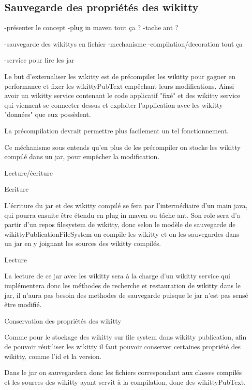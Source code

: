 \subsection{Sauvegarde des propriétés des wikitty}


-présenter le concept
-plug in maven tout ça ?
-tache ant ?

-sauvegarde des wikittys en fichier
-mechanisme
-compilation/decoration tout ça


-service pour lire les jar



Le but d'externaliser les wikitty est de précompiler les wikitty pour gagner en 
performance et fixer les wikittyPubText empêchant leurs modifications. 
Ainsi avoir un wikitty service contenant le code applicatif "fixé" et des 
wikitty service qui viennent se connecter dessus et exploiter l'application avec
les wikitty "données" que eux possèdent.

La précompilation devrait permettre plus facilement un tel fonctionnement. 

Ce méchanisme sous entends qu'en plus de les précompiler on stocke les wikitty
compilé dans un jar, pour empêcher la modification.


Lecture/écriture


Ecriture


L'écriture du jar et des wikitty compilé se fera par l'intermédiaire d'un
main java, qui pourra ensuite être étendu en plug in maven ou tâche ant.
Son role sera d'a partir d'un repos filesystem de wikitty, donc selon 
le modèle de sauvegarde de wikittyPublicationFileSystem on compile les wikitty
et on les sauvegardes dans un jar en y joignant les sources des wikitty compilés.

Lecture


La lecture de ce jar avec les wikitty sera à la charge d'un wikitty service qui
implémentera donc les méthodes de recherche et restauration de wikitty dans le
jar, il n'aura pas besoin des methodes de sauvegarde puisque le jar n'est 
pas sensé être modifié.






Conservation des propriétés des wikitty


Comme pour le stockage des wikitty sur file system dans wikitty publication, 
afin de pouvoir réutiliser les wikitty il faut pouvoir conserver certaines 
propriété des wikitty, comme l'id et la version.

Dans le jar on sauvegardera donc les fichiers correspondant aux classes 
compilés et les sources des wikitty ayant servit à la compilation, donc des
wikittyPubText. 

